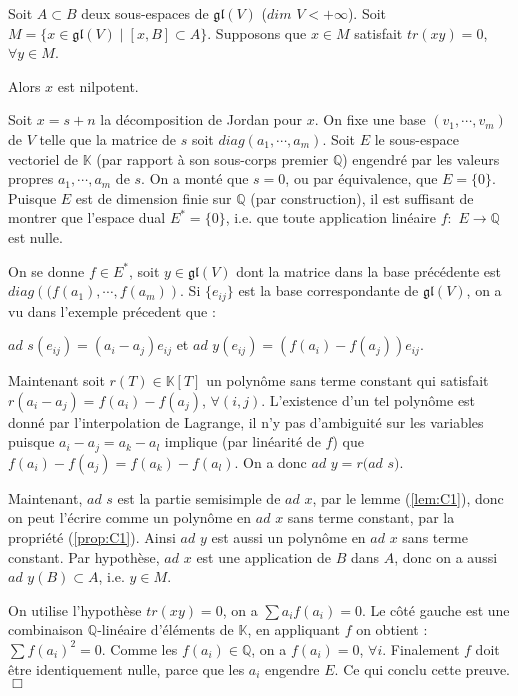 \documentclass[a4paper,openany,12pt]{report}
\newcommand{\KK}{\mathbb{K}}
\newcommand{\QQ}{\mathbb{Q}}
\newcommand{\gl}{\mathfrak{gl}}
\theoremstyle{break}
{\theorembodyfont{\upshape}
\newtheorem*{rmq}{Remarque :}
\newtheorem*{prv}{Preuve :}
\newtheorem*{ex}{Exemples :}
\newtheorem*{exe}{Exemple : }
\newtheorem*{nota}{Notation :}
\newtheorem*{dem}{D\'emonstration :}}
\begin{document}
\begin{lem}\label{lem:C2}
\quad Soit $A \subset B$ deux sous-espaces de $\gl(V)$ ($dim$ $V<+\infty$). Soit $M= \{ x \in \gl(V) \mid [x,B] \subset A \}$. Supposons que $x \in M$ satisfait $tr(xy)=0$, $\forall y \in M$.

Alors $x$ est nilpotent. 
\end{lem}

\begin{prv}
\quad Soit $x=s+n$ la décomposition de Jordan pour $x$. On fixe une base $(v_{1},\cdots,v_{m})$ de $V$ telle que la matrice de $s$ soit $diag(a_{1}, \cdots,a_{m})$. Soit $E$ le sous-espace vectoriel de $\KK$ (par rapport à son sous-corps premier $\QQ$) engendré par les valeurs propres $a_{1},\cdots,a_{m}$ de $s$. On a monté que $s=0$, ou par équivalence, que $E= \{0\}$. Puisque $E$ est de dimension finie sur $\QQ$ (par construction), il est suffisant de montrer que l'espace dual $E^{*}= \{0\}$, i.e. que toute application linéaire $f:$ $E \to \QQ$ est nulle. 

On se donne $f \in E^{*}$, soit $y \in \gl(V)$ dont la matrice dans la base précédente est $diag\left( (f(a_{1}),\cdots,f(a_{m}) \right)$. Si $\{ e_{ij} \}$ est la base correspondante de $\gl(V)$, on a vu dans l'exemple précedent que :
\begin{center}
$ad$ $s(e_{ij}) = (a_{i} - a_{j})e_{ij}$ et $ad$ $y(e_{ij}) = (f(a_{i})-f(a_{j}))e_{ij}$.
\end{center}

Maintenant soit $r(T) \in \KK[T]$ un polynôme sans terme constant qui satisfait $r(a_{i}-a_{j}) = f(a_{i})-f(a_{j})$, $\forall (i,j)$. L’existence d'un tel polynôme est donné par l’interpolation de Lagrange, il n'y pas d’ambiguité sur les variables puisque $a_{i} - a_{j} = a_{k} -a_{l}$ implique (par linéarité de $f$) que $f(a_{i}) - f(a_{j}) = f(a_{k}) -f(a_{l})$. On a donc $ad$ $y= r(ad$ $s)$.

Maintenant, $ad$ $s$ est la partie semisimple de $ad$ $x$, par le lemme (\ref{lem:C1}), donc on peut l'écrire comme un polynôme en $ad$ $x$ sans terme constant, par la propriété (\ref{prop:C1}). Ainsi $ad$ $y$ est aussi un polynôme en $ad$ $x$ sans terme constant. Par hypothèse, $ad$ $x$ est une application de $B$ dans $A$, donc on a aussi $ad$ $y(B) \subset A$, i.e. $y \in M$.

On utilise l'hypothèse $tr(xy)=0$, on a $\sum a_{i}f(a_{i}) = 0$. Le côté gauche est une combinaison $\QQ$-linéaire d'éléments de $\KK$, en appliquant $f$ on obtient : $\sum f(a_{i})^2 = 0$. Comme les $f(a_{i}) \in \QQ$, on a $f(a_{i})=0$, $\forall i$. Finalement $f$ doit être identiquement nulle, parce que les $a_{i}$ engendre $E$. Ce qui conclu cette preuve. $\Box$
\end{prv}
\end{document}
